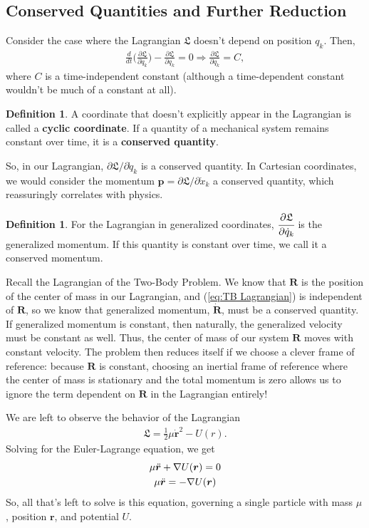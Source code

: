 \documentclass[10pt, psamsfonts]{amsart}
\theoremstyle{definition}
\newtheorem{defn}[thm]{Definition}
\theoremstyle{remark}
\numberwithin{equation}{section}
\begin{document}
\subsection{Conserved Quantities and Further Reduction}
Consider the case where the Lagrangian $\mathfrak{L}$ doesn't depend on position ${q_k}$. Then,
\begin{align*}
  \frac{d}{dt} \bigg(\frac{\partial \mathfrak{L}}{\partial \dot{q}_k}  \bigg) - \frac{\partial \mathfrak{L}}{\partial q_k} = 0 \Rightarrow \frac{\partial \mathfrak{L}}{\partial \dot{q}_k} = C,  
\end{align*}
where $C$ is a time-independent constant (although a time-dependent constant wouldn't be much of a constant at all).
\begin{defn}
  A coordinate that doesn't explicitly appear in the Lagrangian is called a \textbf{cyclic coordinate}. If a quantity of a mechanical system remains constant over time, it is a \textbf{conserved quantity}.
\end{defn}

\noindent So, in our Lagrangian, ${\partial \mathfrak{L}}/{\partial \dot{q}_k}$ is a conserved quantity. In Cartesian coordinates, we would consider the momentum $\bm{p} = {\partial \mathfrak{L}}/{\partial \dot{x}_k}$ a conserved quantity, which reassuringly correlates with physics. 

\begin{defn}
For the Lagrangian in generalized coordinates,
  $\cfrac{\partial \mathfrak{L}}{\partial \dot{q}_k}$
is the generalized momentum. If this quantity is constant over time, we call it a conserved momentum.
\end{defn}

Recall the Lagrangian of the Two-Body Problem. We know that $\bm{R}$ is the position of the center of mass in our Lagrangian, and (\ref{eq:TB Lagrangian}) is independent of $\bm{R}$, so we know that generalized momentum, $\dot{\bm{R}}$, must be a conserved quantity. If generalized momentum is constant, then naturally, the generalized velocity must be constant as well. Thus, the center of mass of our system $\bm{R}$ moves with constant velocity. The problem then reduces itself if we choose a clever frame of reference: because $\bm{R}$ is constant, choosing an inertial frame of reference where the center of mass is stationary and the total momentum is zero allows us to ignore the term dependent on $\bm{R}$ in the Lagrangian entirely!

We are left to observe the behavior of the Lagrangian
\begin{align}
  \label{eq:One Param Lag}
  \mathfrak{L} = \frac{1}{2} \mu \dot{\bm{r}}^2 - U(r).
\end{align}
Solving for the Euler-Lagrange equation, we get
\begin{gather}
  \label{eq:One Param EL}
  \mu \ddot{\bm{r}} + \nabla U(\bm{r}) = 0 \notag \\
  \mu \ddot{\bm{r}} = -\nabla U(\bm{r})
\end{gather}
\noindent So, all that's left to solve is this equation, governing a single particle with mass $\mu$, position $\bm{r}$, and potential $U$.
\end{document}
